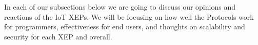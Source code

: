 In each of our subsections below we are going to discuss our opinions and
reactions of the IoT XEPs. We will be focusing on how well the Protocols work
for programmers, effectiveness for end users, and thoughts on scalability and
security for each XEP and overall.
